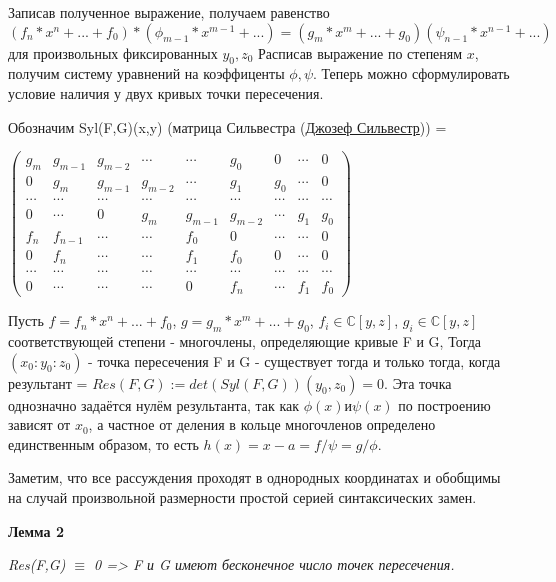 \documentclass[a4paper, 12pt]{article}
\begin{document}
Записав полученное выражение, получаем равенство $(f_n*x^n + ... + f_0)*(\phi_{m-1}*x^{m-1} + ...) = (g_m*x^m + ... + g_0)(\psi_{n-1}*x^{n-1} + ...)$ для произвольных фиксированных $y_0, z_0$
Расписав выражение по степеням $x$, получим систему уравнений на коэффиценты $\phi, \psi$.
Теперь можно сформулировать условие наличия у двух кривых точки пересечения.

Обозначим Syl(F,G)(x,y) (матрица Сильвестра (\href{https://ru.wikipedia.org/wiki/%D0%A1%D0%B8%D0%BB%D1%8C%D0%B2%D0%B5%D1%81%D1%82%D1%80,_%D0%94%D0%B6%D0%B5%D0%B9%D0%BC%D1%81_%D0%94%D0%B6%D0%BE%D0%B7%D0%B5%D1%84}{Джозеф Сильвестр})) =

\smallskip
$\begin{pmatrix}
g_m & g_{m-1} & g_{m-2} & \cdots & \cdots & g_0 & 0 & \cdots & 0 \\
0 & g_m & g_{m-1} & g_{m-2} & \cdots & g_1 & g_0 & \cdots & 0 \\
\cdots & \cdots & \cdots & \cdots & \cdots & \cdots & \cdots & \cdots & \cdots \\
0 & \cdots & 0 & g_m & g_{m-1} & g_{m-2} & \cdots & g_1 & g_0 \\
f_n & f_{n-1} & \cdots & \cdots & f_0 & 0 & \cdots & \cdots & 0 \\
0 & f_n & \cdots & \cdots & f_1 & f_0 & 0 & \cdots & 0 \\
\cdots & \cdots & \cdots & \cdots & \cdots & \cdots & \cdots & \cdots & \cdots \\
0 & \cdots & \cdots & \cdots & 0 & f_n & \cdots & f_1 & f_0
\end{pmatrix}$
\bigskip

Пусть $f=f_n*x^n + ... + f_0$, $g=g_m*x^m + ... + g_0$, $f_i \in \mathbb{C}[y,z]$, $g_i \in \mathbb{C}[y,z]$ соответствующей степени - многочлены, определяющие кривые F и G,\newline
Тогда $(x_0:y_0:z_0)$ - точка пересечения F и G - существует тогда и только тогда, когда результант = $Res(F,G) := det(Syl(F,G))(y_0,z_0) = 0$. Эта точка однозначно задаётся нулём результанта, так как $\phi(x) и \psi(x)$ по построению зависят от $x_0$, а частное от деления в кольце многочленов определено единственным образом, то есть $h(x)=x-a=f/\psi=g/\phi$.

Заметим, что все рассуждения проходят в однородных координатах и обобщимы на случай произвольной размерности простой серией синтаксических замен.

\textbf{Лемма 2}

\textit{Res(F,G) $\equiv$ 0 => F и G имеют бесконечное число точек пересечения.}
\end{document}
